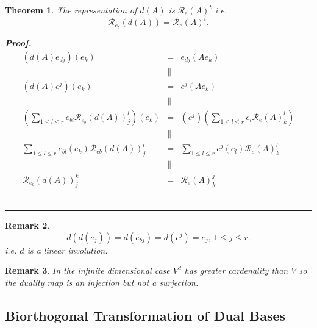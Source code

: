 \documentclass[aps,preprint]{revtex4}
\newtheorem{theorem}{Theorem}
\newtheorem{remark}[theorem]{Remark}
\newenvironment{proof}[1][Proof]{\noindent\textbf{#1.} }{\ \rule{0.5em}{0.5em}}
\begin{document}
\begin{theorem}
The representation of $d\left( A\right) $ is $\mathcal{R}_{e}\left( A\right)
^{t}$ i.e. 
\begin{equation}
\mathcal{R}_{e_{b}}\left( d\left( A\right) \right) =\mathcal{R}_{e}\left(
A\right) ^{t}.
\end{equation}

\begin{proof}
\begin{eqnarray}
\left( d\left( A\right) e_{dj}\right) \left( e_{k}\right) &=&e_{dj}\left(
Ae_{k}\right) \\
&\parallel & \\
\left( d\left( A\right) e^{j}\right) \left( e_{k}\right) &=&e^{j}\left(
Ae_{k}\right) \\
&\parallel & \\
\left( \sum_{1\leq l\leq r}e_{bl}\mathcal{R}_{e_{b}}\left( d\left( A\right)
\right) _{j}^{l}\right) \left( e_{k}\right) &=&\left( e^{j}\right) \left(
\sum_{1\leq l\leq r}e_{l}\mathcal{R}_{e}\left( A\right) _{k}^{l}\right) \\
&\parallel & \\
\sum_{1\leq l\leq r}e_{bl}\left( e_{k}\right) \mathcal{R}_{eb}\left( d\left(
A\right) \right) _{j}^{l} &=&\sum_{1\leq l\leq r}e^{j}\left( e_{l}\right) 
\mathcal{R}_{e}\left( A\right) _{k}^{l} \\
&\parallel & \\
\mathcal{R}_{e_{b}}\left( d\left( A\right) \right) _{j}^{k} &=&\mathcal{R}%
_{e}\left( A\right) _{k}^{j}
\end{eqnarray}
\end{proof}
\end{theorem}

\begin{remark}
\begin{equation}
d\left( d\left( e_{j}\right) \right) =d\left( e_{bj}\right) =d\left(
e^{j}\right) =e_{j},\,1\leq j\leq r.
\end{equation}%
i.e. $d$ is a linear involution.
\end{remark}

\begin{remark}
In the infinite dimensional case $V^{d}$ has greater cardenality than $V$ so
the duality map is an injection but not a surjection.
\end{remark}

\subsection{Biorthogonal Transformation of Dual Bases}
\end{document}
